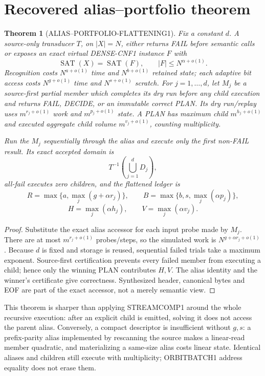 \documentclass[11pt]{article}
\newtheorem{theorem}{Theorem}
\newcommand{\SAT}{\operatorname{SAT}}
\begin{document}
\section{Recovered alias--portfolio theorem}
\begin{theorem}[ALIAS--PORTFOLIO-FLATTENING1]\label{thm:alias}
Fix a constant $d$.  A source-only transducer $T$, on $|X|=N$, either
returns FAIL before semantic calls or exposes an exact virtual DENSE-CNF1
instance $F$ with
\[
 \SAT(X)=\SAT(F),\qquad |F|\le N^{\alpha+o(1)}.
\]
Recognition costs $N^{a+o(1)}$ time and $N^{b+o(1)}$ retained state; each
adaptive bit access costs $N^{g+o(1)}$ time and $N^{s+o(1)}$ scratch.
For $j=1,\ldots,d$, let $M_j$ be a source-first partial member which completes
its dry run before any child execution and returns FAIL, DECIDE, or an
immutable correct PLAN.  Its dry run/replay uses
$m^{r_j+o(1)}$ work and $m^{p_j+o(1)}$ state.  A PLAN has maximum child
$m^{h_j+o(1)}$ and executed aggregate child volume $m^{v_j+o(1)}$, counting
multiplicity.

Run the $M_j$ sequentially through the alias and execute only the first
non-FAIL result.  Its exact accepted domain is
\[
 T^{-1}\!\left(\bigcup_{j=1}^{d}D_j\right),
\]
all-fail executes zero children, and the flattened ledger is
\[
 R=\max\{a,\max_j(g+\alpha r_j)\},\qquad
 B=\max\{b,s,\max_j(\alpha p_j)\},
\]
\[
 H=\max_j(\alpha h_j),\qquad V=\max_j(\alpha v_j).
\]
\end{theorem}
\begin{proof}
Substitute the exact alias accessor for each input probe made by $M_j$.
There are at most $m^{r_j+o(1)}$ probes/steps, so the simulated work is
$N^{g+\alpha r_j+o(1)}$.  Because $d$ is fixed and storage is reused,
sequential failed trials take a maximum exponent.  Source-first certification
prevents every failed member from executing a child; hence only the winning
PLAN contributes $H,V$.  The alias identity and the winner's certificate
give correctness.  Synthesized header, canonical bytes and EOF are part of
the exact accessor, not a merely semantic view.
\end{proof}

This theorem is sharper than applying STREAMCOMP1 around the whole recursive
execution: after an explicit child is emitted, solving it does not access the
parent alias.  Conversely, a compact descriptor is insufficient without
$g,s$: a prefix-parity alias implemented by rescanning the source makes a
linear-read member quadratic, and materializing a same-size alias costs
linear state.  Identical aliases and children still execute with multiplicity;
ORBITBATCH1 address equality does not erase them.
\end{document}
